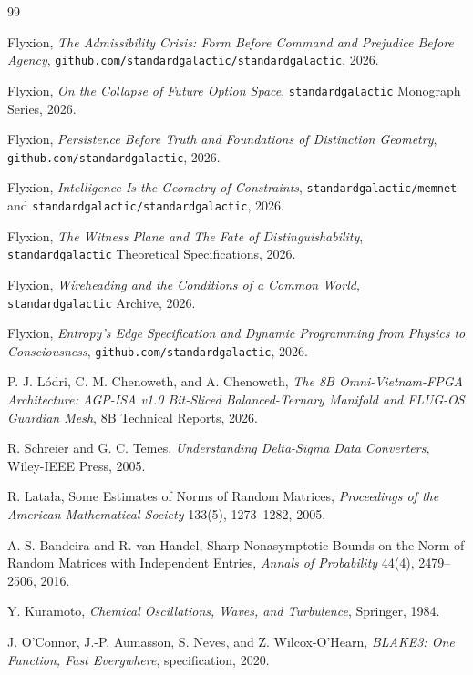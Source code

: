 \documentclass[10pt, twocolumn, a4paper]{article}
\begin{document}
\begin{thebibliography}{99}
\footnotesize

Flyxion, \textit{The Admissibility Crisis: Form Before Command and Prejudice Before Agency}, \texttt{github.com/standardgalactic/standardgalactic}, 2026.

Flyxion, \textit{On the Collapse of Future Option Space}, \texttt{standardgalactic} Monograph Series, 2026.

Flyxion, \textit{Persistence Before Truth and Foundations of Distinction Geometry}, \texttt{github.com/standardgalactic}, 2026.

Flyxion, \textit{Intelligence Is the Geometry of Constraints}, \texttt{standardgalactic/memnet} and \texttt{standardgalactic/standardgalactic}, 2026.

Flyxion, \textit{The Witness Plane and The Fate of Distinguishability}, \texttt{standardgalactic} Theoretical Specifications, 2026.

Flyxion, \textit{Wireheading and the Conditions of a Common World}, \texttt{standardgalactic} Archive, 2026.

Flyxion, \textit{Entropy's Edge Specification and Dynamic Programming from Physics to Consciousness}, \texttt{github.com/standardgalactic}, 2026.

P. J. L\'odri, C. M. Chenoweth, and A. Chenoweth, \textit{The 8B Omni-Vietnam-FPGA Architecture: AGP-ISA v1.0 Bit-Sliced Balanced-Ternary Manifold and FLUG-OS Guardian Mesh}, 8B Technical Reports, 2026.

R. Schreier and G. C. Temes, \textit{Understanding Delta-Sigma Data Converters}, Wiley-IEEE Press, 2005.

R. Lata{\l}a, Some Estimates of Norms of Random Matrices, \textit{Proceedings of the American Mathematical Society} 133(5), 1273--1282, 2005.

A. S. Bandeira and R. van Handel, Sharp Nonasymptotic Bounds on the Norm of Random Matrices with Independent Entries, \textit{Annals of Probability} 44(4), 2479--2506, 2016.

Y. Kuramoto, \textit{Chemical Oscillations, Waves, and Turbulence}, Springer, 1984.

J. O'Connor, J.-P. Aumasson, S. Neves, and Z. Wilcox-O'Hearn, \textit{BLAKE3: One Function, Fast Everywhere}, specification, 2020.

\end{thebibliography}
\end{document}
